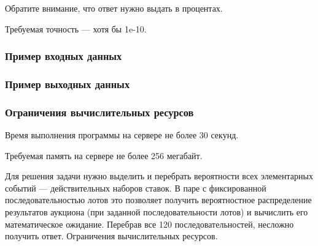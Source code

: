 Обратите внимание, что ответ нужно выдать в процентах.

Требуемая точность — хотя бы 1e-10.

\subsubsection*{Пример входных данных}


\subsubsection*{Пример выходных данных}


\subsubsection*{Ограничения вычислительных ресурсов}

Время выполнения программы на сервере не более 30 секунд.

Требуемая память на сервере не более 256 мегабайт.

\solutionSection

Для решения задачи нужно выделить и перебрать вероятности всех элементарных событий — действительных наборов ставок. В паре с фиксированной последовательностью лотов это позволяет получить вероятностное распределение результатов аукциона (при заданной последовательности лотов) и вычислить его математическое ожидание. Перебрав все 120 последовательностей, несложно получить ответ. Ограничения вычислительных ресурсов.

